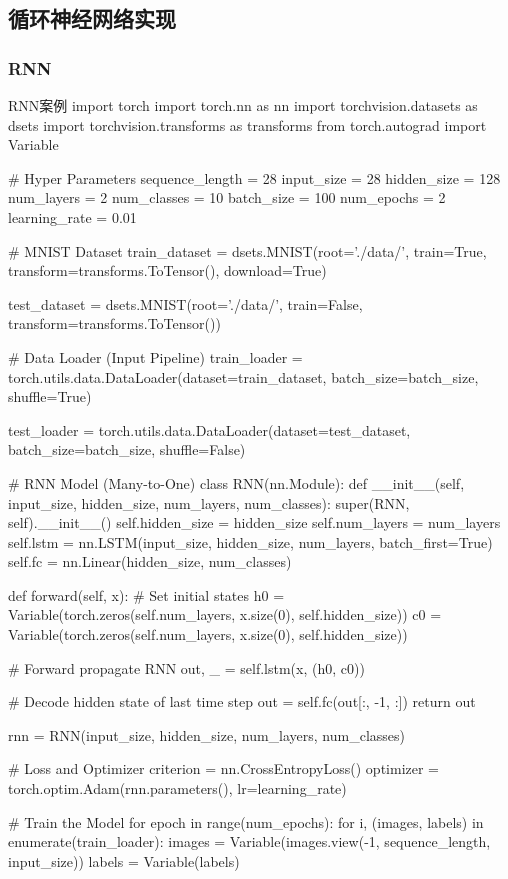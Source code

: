 \documentclass[openbib]{article}
\begin{document}
\subsection{循环神经网络实现}
\subsubsection{RNN}
\begin{Python}{RNN案例}
import torch
import torch.nn as nn
import torchvision.datasets as dsets
import torchvision.transforms as transforms
from torch.autograd import Variable

# Hyper Parameters
sequence_length = 28
input_size = 28
hidden_size = 128
num_layers = 2
num_classes = 10
batch_size = 100
num_epochs = 2
learning_rate = 0.01

# MNIST Dataset
train_dataset = dsets.MNIST(root='./data/',
train=True,
transform=transforms.ToTensor(),
download=True)

test_dataset = dsets.MNIST(root='./data/',
train=False,
transform=transforms.ToTensor())

# Data Loader (Input Pipeline)
train_loader = torch.utils.data.DataLoader(dataset=train_dataset,
batch_size=batch_size,
shuffle=True)

test_loader = torch.utils.data.DataLoader(dataset=test_dataset,
batch_size=batch_size,
shuffle=False)


# RNN Model (Many-to-One)
class RNN(nn.Module):
	def __init__(self, input_size, hidden_size, num_layers, num_classes):
		super(RNN, self).__init__()
		self.hidden_size = hidden_size
		self.num_layers = num_layers
		self.lstm = nn.LSTM(input_size, hidden_size, num_layers, batch_first=True)
		self.fc = nn.Linear(hidden_size, num_classes)

	def forward(self, x):
		# Set initial states
		h0 = Variable(torch.zeros(self.num_layers, x.size(0), self.hidden_size))
		c0 = Variable(torch.zeros(self.num_layers, x.size(0), self.hidden_size))

		# Forward propagate RNN
		out, _ = self.lstm(x, (h0, c0))

		# Decode hidden state of last time step
		out = self.fc(out[:, -1, :])
		return out


rnn = RNN(input_size, hidden_size, num_layers, num_classes)

# Loss and Optimizer
criterion = nn.CrossEntropyLoss()
optimizer = torch.optim.Adam(rnn.parameters(), lr=learning_rate)

# Train the Model
for epoch in range(num_epochs):
	for i, (images, labels) in enumerate(train_loader):
		images = Variable(images.view(-1, sequence_length, input_size))
		labels = Variable(labels)


\end{Python}
\end{document}
